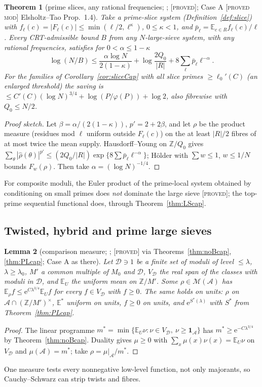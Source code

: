 \documentclass[10pt,reqno]{amsart}
\newtheorem{theorem}{Theorem}[section]
\newtheorem{lemma}[theorem]{Lemma}
\theoremstyle{definition}
\theoremstyle{remark}
\newcommand{\A}{\mathcal A}
\newcommand{\E}{\mathbb E}
\newcommand{\Z}{\mathbb Z}
\newcommand{\ind}{\mathbf 1}
\newcommand{\e}{\mathrm e}
\newcommand{\lab}[1]{\textup{[\textsc{#1}]}}
\begin{document}
\begin{theorem}[prime slices, any rational frequencies; {\cite[Thm~4.1, Cor.~4.2, Rem.~4.4]{LS}}; \lab{proved}; Case A \lab{proved mod} Elsholtz--Tao Prop.~1.4]\label{thm:LSslice}
Take a prime-slice system (Definition~\ref{def:slice}) with
$f_\ell(c)=|F_\ell(c)|\leq\min(\ell/2,\ell^\kappa)$, $0\leq\kappa<1$, and
$\bar p_\ell=\E_{c\in R}f_\ell(c)/\ell$.  Every CRT-admissible bound $B$ from any
$N$-large-sieve system, with any rational frequencies, satisfies for
$0<\alpha\leq1-\kappa$
\[
 \log(N/B)\leq\frac{\alpha\log N}{2(1-\kappa)}+\log\frac{2Q_0}{|R|}+8\sum_\ell\bar p_\ell\ell^{-\alpha}.
\]
For the families of Corollary~\ref{cor:sliceCap} with all slice primes
$\geq\ell_0'(C)$ (an enlarged threshold) the saving is
$\leq C'(C)(\log N)^{3/4}+\log(P/\varphi(P))+\log2$, also fibrewise with
$Q_0\leq N/2$.
\end{theorem}
\begin{proof}[Proof sketch]
Let $\beta=\alpha/(2(1-\kappa))$, $p'=2+2\beta$, and let $\rho$ be the product measure (residues
mod $\ell$ uniform outside $F_\ell(c)$) on the at least $|R|/2$ fibres of at most
twice the mean supply.  Hausdorff--Young on $\Z/Q_0$ gives
$\sum_\theta|\hat\rho(\theta)|^{p'}\leq(2Q_0/|R|)\exp\{8\sum\bar p_\ell\ell^{-\alpha}\}$; H\"older with
$\sum w\leq1$, $w\leq1/N$ bounds $F_w(\rho)$.  Then take $\alpha=(\log N)^{-1/4}$.
\end{proof}
For composite moduli, the Euler product of the prime-local system obtained
by conditioning on small primes does \emph{not} dominate the large sieve
\cite[Ex.~5.2]{LS} \lab{proved}; the top-prime sequential functional does,
through Theorem~\ref{thm:LScap}.

\subsection{Twisted, hybrid and prime large sieves}
\begin{lemma}[comparison measure; {\cite[Lemmas~1.1, 1.2]{LS2}}; \lab{proved} via Theorems~\ref{thm:noBcap}, \ref{thm:PLcap}; Case A as there]\label{lem:compmeas}
Let $\mathcal D\ni1$ be a finite set of moduli of level $\leq\lambda$, $\lambda\geq\lambda_0$,
$M'$ a common multiple of $M_0$ and $\mathcal D$, $V_{\mathcal D}$ the real span of
the classes with moduli in $\mathcal D$, and $\E_U$ the uniform mean on $\Z/M'$.
Some $\rho\in\mathcal M(\A)$ has $\E_\rho f\leq\e^{C\lambda^{3/4}}\E_Uf$ for every
$f\in V_{\mathcal D}$ with $f\geq0$.  The same holds on units: $\rho$ on
$\A\cap(\Z/M')^\times$, $\E^*$ uniform on units, $f\geq0$ on units, and
$\e^{S^*(\lambda)}$ with $S^*$ from Theorem~\ref{thm:PLcap}.
\end{lemma}
\begin{proof}
The linear programme $m^*=\min\{\E_U\nu:\nu\in V_{\mathcal D},\ \nu\geq\ind_\A\}$ has
$m^*\geq\e^{-C\lambda^{3/4}}$ by Theorem~\ref{thm:noBcap}.  Duality gives $\mu\geq0$ with
$\sum_x\mu(x)\nu(x)=\E_U\nu$ on $V_{\mathcal D}$ and $\mu(\A)=m^*$; take $\rho=\mu|_\A/m^*$.
\end{proof}
One measure tests every nonnegative low-level function, not only
majorants, so Cauchy--Schwarz can strip twists and fibres.
\end{document}
